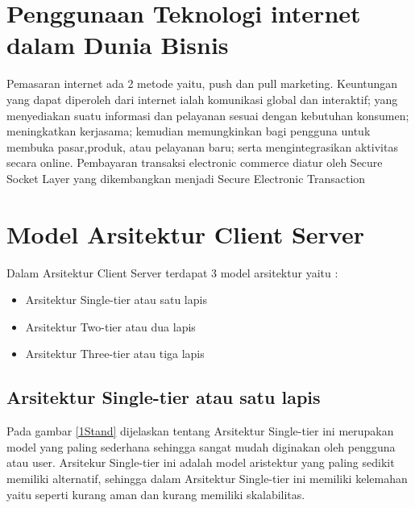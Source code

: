 {\section {Penggunaan Teknologi internet dalam Dunia Bisnis}
Pemasaran internet ada 2 metode yaitu, push dan pull marketing. Keuntungan yang dapat diperoleh dari internet ialah komunikasi global dan interaktif; yang menyediakan suatu informasi dan pelayanan sesuai dengan kebutuhan konsumen; meningkatkan kerjasama; kemudian memungkinkan bagi pengguna untuk membuka pasar,produk, atau pelayanan baru; serta mengintegrasikan aktivitas secara online. 
Pembayaran transaksi electronic commerce diatur oleh Secure Socket Layer yang dikembangkan menjadi Secure Electronic Transaction

\section{Model Arsitektur Client Server}
Dalam Arsitektur Client Server terdapat 3 model arsitektur yaitu :

	\begin{itemize}
	\item Arsitektur Single-tier atau satu lapis
	\item Arsitektur Two-tier atau dua lapis
	\item Arsitektur Three-tier atau tiga lapis
	\end{itemize}

\subsection{Arsitektur Single-tier atau satu lapis}
Pada gambar \ref{1Stand} dijelaskan tentang Arsitektur Single-tier ini merupakan model yang paling sederhana sehingga sangat mudah diginakan oleh pengguna atau user.
Arsitekur Single-tier ini adalah model aristektur yang paling sedikit memiliki alternatif, sehingga dalam Arsitektur Single-tier ini
memiliki kelemahan yaitu seperti kurang aman dan kurang memiliki skalabilitas.

}
